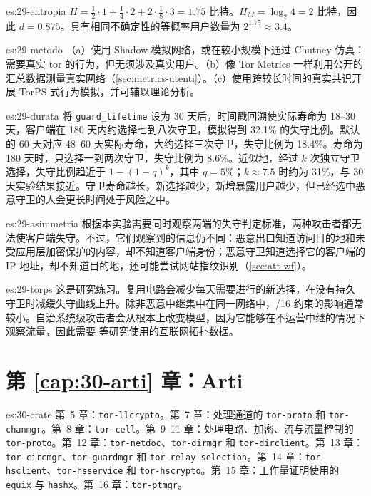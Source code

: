 \begin{soluzione}{es:29-entropia}
$H=\tfrac12\cdot1+\tfrac14\cdot2+2\cdot\tfrac18\cdot3=1.75$ 比特。$H_M=\log_2 4=2$ 比特，因此 $d=0.875$。具有相同不确定性的等概率用户数量为 $2^{1.75}\approx3.4$。
\end{soluzione}

\begin{soluzione}{es:29-metodo}
（a）使用 Shadow 模拟网络，或在较小规模下通过 Chutney 仿真：需要真实 tor 的行为，但无须涉及真实用户。（b）像 Tor Metrics 一样利用公开的汇总数据测量真实网络（\cref{sec:metrics-utenti}）。（c）使用跨较长时间的真实共识开展 TorPS 式行为模拟，并可辅以理论分析。
\end{soluzione}

\begin{soluzione}{es:29-durata}
将 \texttt{guard\_lifetime} 设为 30 天后，时间戳回溯使实际寿命为 18--30 天，客户端在 180 天内约选择七到八次守卫，模拟得到 32.1\% 的失守比例。默认的 60 天对应 48--60 天实际寿命，大约选择三次守卫，失守比例为 18.4\%。寿命为 180 天时，只选择一到两次守卫，失守比例为 8.6\%。近似地，经过 $k$ 次独立守卫选择，失守比例趋近于 $1-(1-q)^k$，其中 $q=5\%$；$k\approx7.5$ 时约为 31\%，与 30 天实验结果接近。守卫寿命越长，新选择越少，新增暴露用户越少，但已经选中恶意守卫的人会更长时间处于风险之中。
\end{soluzione}

\begin{soluzione}{es:29-asimmetria}
根据本实验需要同时观察两端的失守判定标准，两种攻击者都无法使客户端失守。不过，它们观察到的信息仍不同：恶意出口知道访问目的地和未受应用层加密保护的内容，却不知道客户端身份；恶意守卫知道选择它的客户端的 IP 地址，却不知道目的地，还可能尝试网站指纹识别（\cref{sec:att-wf}）。
\end{soluzione}

\begin{soluzione}{es:29-torps}
这是研究练习。复用电路会减少每天需要进行的新选择，在没有持久守卫时减缓失守曲线上升。除非恶意中继集中在同一网络中，/16 约束的影响通常较小。自治系统级攻击者会从根本上改变模型，因为它能够在不运营中继的情况下观察流量，因此需要 \cite{johnson2013users} 等研究使用的互联网拓扑数据。
\end{soluzione}

\section*{第 \ref{cap:30-arti} 章：Arti}

\begin{soluzione}{es:30-crate}
第~5 章：\texttt{tor-llcrypto}。第~7 章：处理通道的 \texttt{tor-proto} 和 \texttt{tor-chanmgr}。第~8 章：\texttt{tor-cell}。第~9--11 章：处理电路、加密、流与流量控制的 \texttt{tor-proto}。第~12 章：\texttt{tor-netdoc}、\texttt{tor-dirmgr} 和 \texttt{tor-dirclient}。第~13 章：\texttt{tor-circmgr}、\texttt{tor-guardmgr} 和 \texttt{tor-relay-selection}。第~14 章：\texttt{tor-hsclient}、\texttt{tor-hsservice} 和 \texttt{tor-hscrypto}。第~15 章：工作量证明使用的 \texttt{equix} 与 \texttt{hashx}。第~16 章：\texttt{tor-ptmgr}。
\end{soluzione}

